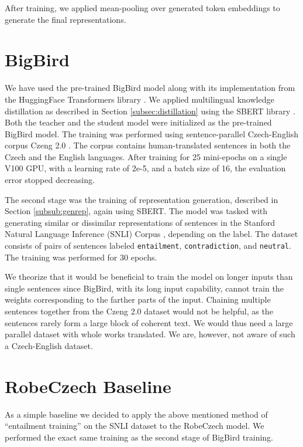 After training, we applied mean-pooling over generated token embeddings to generate the final representations.

\section{BigBird}

We have used the pre-trained BigBird model along with its implementation from the HuggingFace Transformers library \citep{huggingface}. 
We applied multilingual knowledge distillation as described in Section \ref{subsec:distillation} using the SBERT library \citep{sbert}. 
Both the teacher and the student model were initialized as the pre-trained BigBird model.
The training was performed using sentence-parallel Czech-English corpus Czeng 2.0 \citep{czeng2.0}. 
The corpus contains human-translated sentences in both the Czech and the English languages. 
After training for 25 mini-epochs on a single V100 GPU, with a learning rate of 2e-5, and a batch size of 16, the evaluation error stopped decreasing.

The second stage was the training of representation generation, described in Section \ref{subsub:genrep}, again using SBERT.
The model was tasked with generating similar or dissimilar representations of sentences in the Stanford Natural Language Inference (SNLI) Corpus \citep{snli}, depending on the label.
The dataset consists of pairs of sentences labeled \texttt{entailment}, \texttt{contradiction}, and \texttt{neutral}.
The training was performed for 30 epochs.

We theorize that it would be beneficial to train the model on longer inputs than single sentences since BigBird, with its long input capability, cannot train the weights corresponding to the farther parts of the input.
Chaining multiple sentences together from the Czeng 2.0 dataset would not be helpful, as the sentences rarely form a large block of coherent text.
We would thus need a large parallel dataset with whole works translated.
We are, however, not aware of such a Czech-English dataset.

\section{RobeCzech Baseline}

As a simple baseline we decided to apply the above mentioned method of ``entailment training'' on the SNLI dataset to the RobeCzech model.
We performed the exact same training as the second stage of BigBird training.

